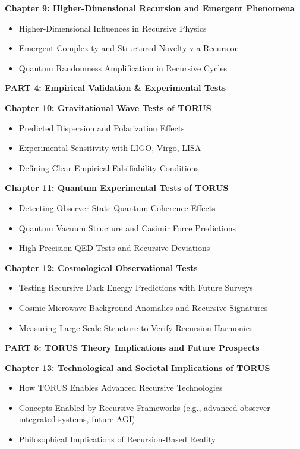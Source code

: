 \documentclass[
]{article}
\begin{document}
\textbf{Chapter 9: Higher-Dimensional Recursion and Emergent Phenomena}

\begin{itemize}
\item
  Higher-Dimensional Influences in Recursive Physics
\item
  Emergent Complexity and Structured Novelty via Recursion
\item
  Quantum Randomness Amplification in Recursive Cycles
\end{itemize}

\textbf{PART 4: Empirical Validation \& Experimental Tests}

\textbf{Chapter 10: Gravitational Wave Tests of TORUS}

\begin{itemize}
\item
  Predicted Dispersion and Polarization Effects
\item
  Experimental Sensitivity with LIGO, Virgo, LISA
\item
  Defining Clear Empirical Falsifiability Conditions
\end{itemize}

\textbf{Chapter 11: Quantum Experimental Tests of TORUS}

\begin{itemize}
\item
  Detecting Observer-State Quantum Coherence Effects
\item
  Quantum Vacuum Structure and Casimir Force Predictions
\item
  High-Precision QED Tests and Recursive Deviations
\end{itemize}

\textbf{Chapter 12: Cosmological Observational Tests}

\begin{itemize}
\item
  Testing Recursive Dark Energy Predictions with Future Surveys
\item
  Cosmic Microwave Background Anomalies and Recursive Signatures
\item
  Measuring Large-Scale Structure to Verify Recursion Harmonics
\end{itemize}

\textbf{PART 5: TORUS Theory Implications and Future Prospects}

\textbf{Chapter 13: Technological and Societal Implications of TORUS}

\begin{itemize}
\item
  How TORUS Enables Advanced Recursive Technologies
\item
  Concepts Enabled by Recursive Frameworks (e.g., advanced
  observer-integrated systems, future AGI)
\item
  Philosophical Implications of Recursion-Based Reality
\end{itemize}
\end{document}
